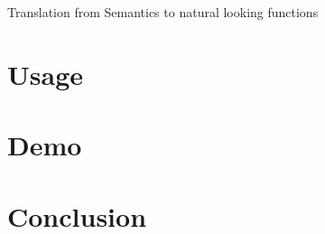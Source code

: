 \documentclass[10pt,xcolor=svgnames]{beamer} %
\begin{document}
\begin{frame}[fragile]{Translation from Semantics to natural looking functions}
\end{frame}

\section{Usage}

\section{Demo}

\section{Conclusion}
\end{document}
